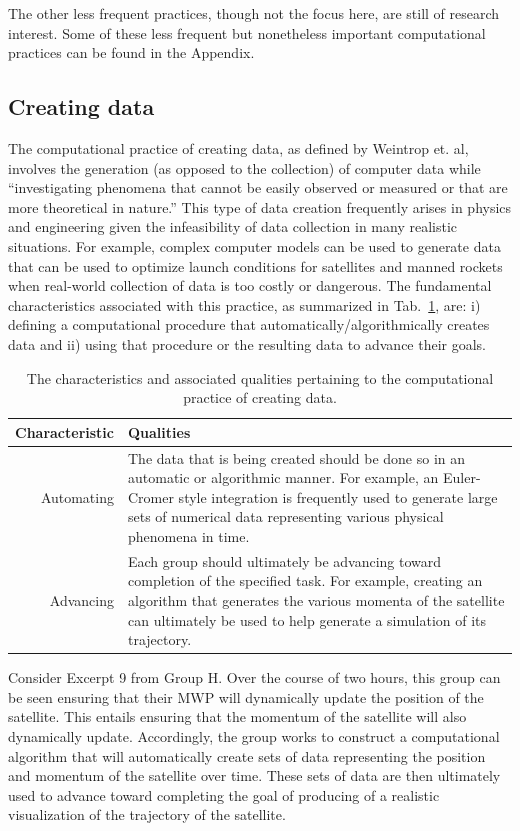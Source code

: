 \documentclass{msuphddissertation}
\begin{document}
\begin{doublespace}
The other less frequent practices, though not the focus here, are still of research interest.  Some of these less frequent but nonetheless important computational practices can be found in the Appendix.

%
%
%
%
%
%
%
%
%
%
%
%
%
%
%
%

\subsection{Creating data}

The computational practice of creating data, as defined by Weintrop et. al, involves the generation (as opposed to the collection) of computer data while ``investigating phenomena that cannot be easily observed or measured or that are more theoretical in nature.''  This type of data creation frequently arises in physics and engineering given the infeasibility of data collection in many realistic situations.  For example, complex computer models can be used to generate data that can be used to optimize launch conditions for satellites and manned rockets when real-world collection of data is too costly or dangerous.  The fundamental characteristics associated with this practice, as summarized in Tab.~\ref{CH5:CreatingData}, are: i) defining a computational procedure that automatically/algorithmically creates data and ii) using that procedure or the resulting data to advance their goals.

\begin{table}[t]
\begin{tabular}{r|p{}}
Characteristic & Qualities \\\hline\hline
Automating & The data that is being created should be done so in an automatic or algorithmic manner.  For example, an Euler-Cromer style integration is frequently used to generate large sets of numerical data representing various physical phenomena in time.\\
Advancing & Each group should ultimately be advancing toward completion of the specified task.  For example, creating an algorithm that generates the various momenta of the satellite can ultimately be used to help generate a simulation of its trajectory.\\
\end{tabular}\caption{The characteristics and associated qualities pertaining to the computational practice of creating data.}\label{CH5:CreatingData}
\end{table}

Consider Excerpt 9 from Group H.  Over the course of two hours, this group can be seen ensuring that their MWP will dynamically update the position of the satellite.  This entails ensuring that the momentum of the satellite will also dynamically update.  Accordingly, the group works to construct a computational algorithm that will automatically create sets of data representing the position and momentum of the satellite over time.  These sets of data are then ultimately used to advance toward completing the goal of producing of a realistic visualization of the trajectory of the satellite.


\end{doublespace}
\end{document}
